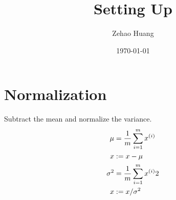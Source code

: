\documentclass{article}
\title{Setting Up}
\author{Zehao Huang}
\date{\today}
\begin{document}
    \maketitle

    \section{Normalization}
    Subtract the mean and normalize the variance. 
    \begin{align*}
        \mu      &= \frac{1}{m} \sum_{i=1}^m x^{(i)} \\
        x        &:= x - \mu \\
        \sigma^2 &= \frac{1}{m} \sum_{i=1}^m x^{(i)} \*\* 2 \\
        x        &:= x / \sigma^2
    \end{align*}
    
\end{document}
